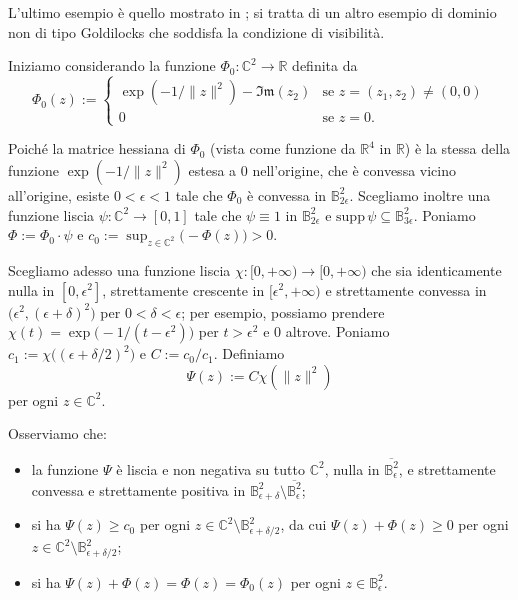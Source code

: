 L'ultimo esempio è quello mostrato in \cite[Section 5.2]{CMS}; si tratta di un altro esempio di dominio non di tipo Goldilocks che soddisfa la condizione di visibilità.

Iniziamo considerando la funzione $\Phi_0:\mathbb{C}^2\longrightarrow\mathbb{R}$ definita da
$$\Phi_0(z):=\begin{cases}
    \exp(-1/\|z\|^2)-\mathfrak{Im}(z_2) &\mbox{se }z=(z_1,z_2)\not=(0,0)\\
    0 &\mbox{se }z=0.
\end{cases}$$

Poiché la matrice hessiana di $\Phi_0$ (vista come funzione da $\mathbb{R}^4$ in $\mathbb{R}$) è la stessa della funzione $\exp(-1/\|z\|^2)$ estesa a $0$ nell'origine, che è convessa vicino all'origine, esiste $0<\epsilon<1$ tale che $\Phi_0$ è convessa in $\mathbb{B}^2_{2\epsilon}$. Scegliamo inoltre una funzione liscia $\psi:\mathbb{C}^2\longrightarrow[0,1]$ tale che $\psi\equiv 1$ in $\mathbb{B}^2_{2\epsilon}$ e $\text{supp}\,{\psi}\subseteq \mathbb{B}^2_{3\epsilon}$. Poniamo $\Phi:=\Phi_0\cdot\psi$ e $c_0:=\displaystyle\sup_{z\in\mathbb{C}^2}\big(-\Phi(z)\big)>0$.

Scegliamo adesso una funzione liscia $\chi:[0,+\infty)\longrightarrow[0,+\infty)$ che sia identicamente nulla in $[0,\epsilon^2]$, strettamente crescente in $[\epsilon^2,+\infty)$ e strettamente convessa in $\big(\epsilon^2,(\epsilon+\delta)^2\big)$ per $0<\delta<\epsilon$; per esempio, possiamo prendere $\chi(t)=\exp\big(-1/(t-\epsilon^2)\big)$ per $t>\epsilon^2$ e $0$ altrove. Poniamo $c_1:=\chi\big((\epsilon+\delta/2)^2\big)$ e $C:=c_0/c_1$. Definiamo
$$\Psi(z):=C\chi(\|z\|^2)$$
per ogni $z\in\mathbb{C}^2$.

Osserviamo che:
\begin{itemize}
    \item la funzione $\Psi$ è liscia e non negativa su tutto $\mathbb{C}^2$, nulla in $\overline{\mathbb{B}^2_\epsilon}$, e strettamente convessa e strettamente positiva in $\mathbb{B}^2_{\epsilon+\delta}\setminus\overline{\mathbb{B}^2_\epsilon}$;
    \item si ha $\Psi(z)\ge c_0$ per ogni $z\in\mathbb{C}^2\setminus\mathbb{B}^2_{\epsilon+\delta/2}$, da cui $\Psi(z)+\Phi(z)\ge 0$ per ogni $z\in\mathbb{C}^2\setminus\mathbb{B}^2_{\epsilon+\delta/2}$;
    \item si ha $\Psi(z)+\Phi(z)=\Phi(z)=\Phi_0(z)$ per ogni $z\in\mathbb{B}^2_\epsilon$.
\end{itemize}

